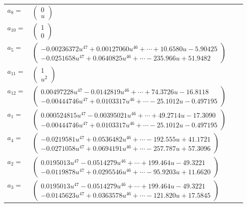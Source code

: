 \documentclass[1p]{elsarticle_modified}
\theoremstyle{definition}
\begin{document}
\begin{tabular}{m{7pt} m{180pt} m{7pt} m{180pt} }
\flushright $a_{8}=$&$\begin{pmatrix}0\\u\end{pmatrix}$ \\
\flushright $a_{10}=$&$\begin{pmatrix}1\\0\end{pmatrix}$ \\
\flushright $a_{5}=$&$\begin{pmatrix}-0.00236372 u^{47}+0.00127060 u^{46}+\cdots+10.6580 u-5.90425\\-0.0251658 u^{47}+0.0640825 u^{46}+\cdots-235.966 u+51.9482\end{pmatrix}$ \\
\flushright $a_{11}=$&$\begin{pmatrix}1\\u^2\end{pmatrix}$ \\
\flushright $a_{12}=$&$\begin{pmatrix}0.00497228 u^{47}-0.0142819 u^{46}+\cdots+74.3726 u-16.8118\\-0.00444746 u^{47}+0.0103317 u^{46}+\cdots-25.1012 u-0.497195\end{pmatrix}$ \\
\flushright $a_{1}=$&$\begin{pmatrix}0.000524815 u^{47}-0.00395021 u^{46}+\cdots+49.2714 u-17.3090\\-0.00444746 u^{47}+0.0103317 u^{46}+\cdots-25.1012 u-0.497195\end{pmatrix}$ \\
\flushright $a_{4}=$&$\begin{pmatrix}-0.0219581 u^{47}+0.0536482 u^{46}+\cdots-192.555 u+41.1721\\-0.0271058 u^{47}+0.0694191 u^{46}+\cdots-257.787 u+57.3096\end{pmatrix}$ \\
\flushright $a_{2}=$&$\begin{pmatrix}0.0195013 u^{47}-0.0514279 u^{46}+\cdots+199.464 u-49.3221\\-0.0119878 u^{47}+0.0295546 u^{46}+\cdots-95.9203 u+11.6620\end{pmatrix}$ \\
\flushright $a_{3}=$&$\begin{pmatrix}0.0195013 u^{47}-0.0514279 u^{46}+\cdots+199.464 u-49.3221\\-0.0145623 u^{47}+0.0363578 u^{46}+\cdots-121.820 u+17.5845\end{pmatrix}$ \\

\end{tabular}
\end{document}

